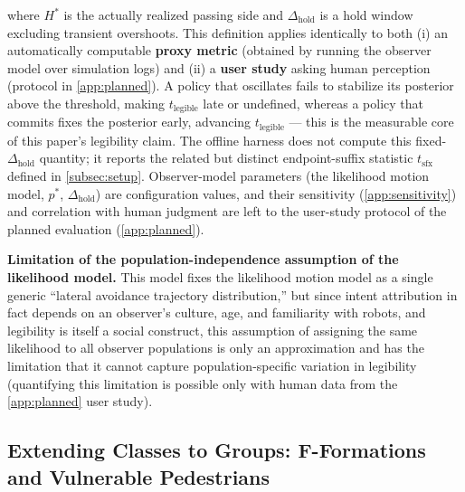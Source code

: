 where $H^*$ is the actually realized passing side and $\Delta_{\text{hold}}$ is a hold window excluding transient overshoots. This definition applies identically to both (i) an automatically computable \textbf{proxy metric} (obtained by running the observer model over simulation logs) and (ii) a \textbf{user study} asking human perception (protocol in \cref{app:planned}). A policy that oscillates fails to stabilize its posterior above the threshold, making $t_{\text{legible}}$ late or undefined, whereas a policy that commits fixes the posterior early, advancing $t_{\text{legible}}$ --- this is the measurable core of this paper's legibility claim. The offline harness does not compute this fixed-$\Delta_{\text{hold}}$ quantity; it reports the related but distinct endpoint-suffix statistic $t_{\text{sfx}}$ defined in \cref{subsec:setup}. Observer-model parameters (the likelihood motion model, $p^*$, $\Delta_{\text{hold}}$) are configuration values, and their sensitivity (\cref{app:sensitivity}) and correlation with human judgment are left to the user-study protocol of the planned evaluation (\cref{app:planned}).

\noindent\textbf{Limitation of the population-independence assumption of the likelihood model.} This model fixes the likelihood motion model as a single generic ``lateral avoidance trajectory distribution,'' but since intent attribution in fact depends on an observer's culture, age, and familiarity with robots, and legibility is itself a social construct, this assumption of assigning the same likelihood to all observer populations is only an approximation and has the limitation that it cannot capture population-specific variation in legibility (quantifying this limitation is possible only with human data from the \cref{app:planned} user study).


\subsection{Extending Classes to Groups: F-Formations and Vulnerable Pedestrians}\label{subsec:groups}

